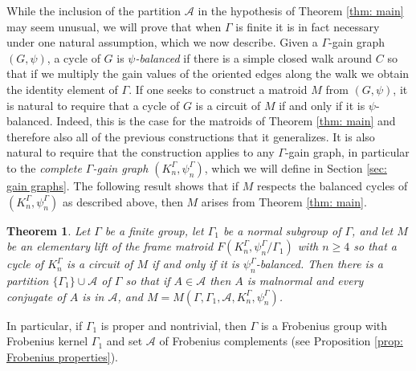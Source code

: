 \documentclass[12pt]{article}
\newtheorem{theorem}{Theorem}[section]
\theoremstyle{definition}
\newcommand{\cA}{\mathcal{A}}
\begin{document}
While the inclusion of the partition $\cA$ in the hypothesis of Theorem \ref{thm: main} may seem unusual, we will prove that when $\Gamma$ is finite it is in fact necessary under one natural assumption, which we now describe.
Given a $\Gamma$-gain graph $(G, \psi)$, a cycle of $G$ is \emph{$\psi$-balanced} if there is a simple closed walk around $C$ so that if we multiply the gain values of the oriented edges along the walk we obtain the identity element of $\Gamma$.
If one seeks to construct a matroid $M$ from $(G, \psi)$, it is natural to require that a cycle of $G$ is a circuit of $M$ if and only if it is $\psi$-balanced.
Indeed, this is the case for the matroids of Theorem \ref{thm: main} and therefore also all of the previous constructions that it generalizes.
It is also natural to require that the construction applies to any $\Gamma$-gain graph, in particular to the \emph{complete $\Gamma$-gain graph $(K_n^{\Gamma}, \psi_n^{\Gamma})$}, which we will define in Section \ref{sec: gain graphs}.
The following result shows that if $M$ respects the balanced cycles of $(K_n^{\Gamma}, \psi_n^{\Gamma})$ as described above, then $M$ arises from Theorem \ref{thm: main}.


\begin{theorem} \label{thm: main converse}
Let $\Gamma$ be a finite group, let $\Gamma_1$ be a normal subgroup of $\Gamma$, and let $M$ be an elementary lift of the frame matroid $F(K_n^{\Gamma}, \psi_n^{\Gamma}/\Gamma_1)$ with $n \ge 4$ so that a cycle of $K_n^{\Gamma}$ is a circuit of $M$ if and only if it is $\psi_n^{\Gamma}$-balanced.
Then there is a partition $\{\Gamma_1\} \cup \cA$ of $\Gamma$ so that if $A \in \cA$ then $A$ is malnormal and every conjugate of $A$ is in $\cA$, and $M = M(\Gamma, \Gamma_1, \cA, K_n^{\Gamma}, \psi_n^{\Gamma})$.
\end{theorem}



In particular, if $\Gamma_1$ is proper and nontrivial, then $\Gamma$ is a Frobenius group with Frobenius kernel $\Gamma_1$ and set $\cA$ of Frobenius complements (see Proposition \ref{prop: Frobenius properties}).
\end{document}
